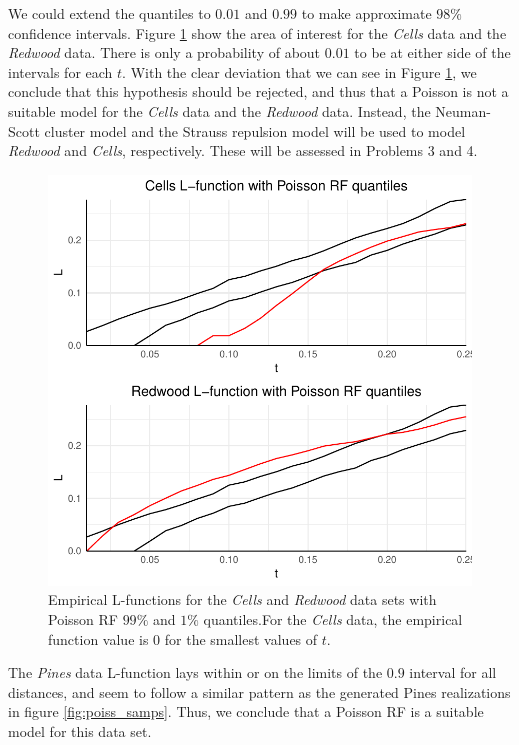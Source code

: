 We could extend the quantiles to $0.01$ and $0.99$ to make approximate $98\%$ confidence intervals. Figure \ref{fig:poiss_quantiles2} show the area of interest for the \textit{Cells} data and the \textit{Redwood} data. There is only a probability of about $0.01$ to be at either side of the intervals for each $t$. With the clear deviation that we can see in Figure \ref{fig:poiss_quantiles2}, we conclude that this hypothesis should be rejected, and thus that a Poisson is not a suitable model for the \textit{Cells} data and the \textit{Redwood} data. Instead, the Neuman-Scott cluster model and the Strauss repulsion model will be used to model \textit{Redwood} and \textit{Cells}, respectively. These will be assessed in Problems 3 and 4. 

\begin{figure}
    \centering
    \includegraphics[scale=0.95]{figures/prob1_quantiles2.pdf}
    \caption{Empirical L-functions for the \textit{Cells} and \textit{Redwood} data sets with Poisson RF $99\%$ and $1\%$ quantiles.For the \textit{Cells} data, the empirical function value is $0$ for the smallest values of $t$.}
    \label{fig:poiss_quantiles2}
\end{figure}

The \textit{Pines} data L-function lays within or on the limits of the $0.9$ interval for all distances, and seem to follow a similar pattern as the generated Pines realizations in figure \ref{fig:poiss_samps}. Thus, we conclude that a Poisson RF is a suitable model for this data set.